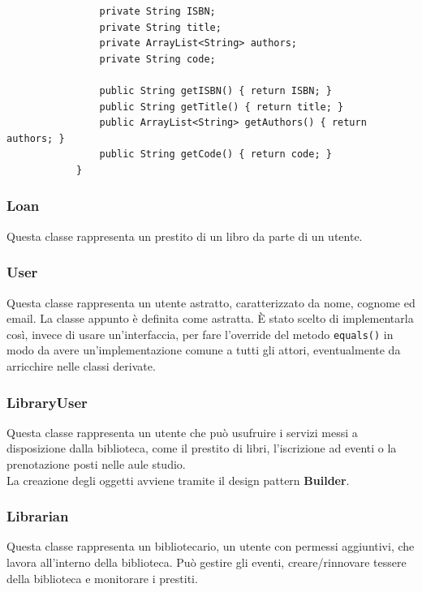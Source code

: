 \begin{listing}[H]
\begin{verbatim}
                private String ISBN;
                private String title;
                private ArrayList<String> authors;
                private String code;
            
                public String getISBN() { return ISBN; }
                public String getTitle() { return title; }
                public ArrayList<String> getAuthors() { return authors; }
                public String getCode() { return code; }
            }
        \end{verbatim}
        \caption{Implementazione del pattern Builder nella classe \texttt{Book}}
        \label{lst:bookBuilder}
    \end{listing}

    \subsubsection{Loan}
    Questa classe rappresenta un prestito di un libro da parte di un utente.\\

    \subsubsection{User}
    Questa classe rappresenta un utente astratto, caratterizzato da nome, cognome ed email. La classe appunto è definita come astratta. È stato scelto di implementarla così, invece di usare un'interfaccia, per fare l'override del metodo \texttt{equals()} in modo da avere un'implementazione comune a tutti gli attori, eventualmente da arricchire nelle classi derivate.\\

     \subsubsection{LibraryUser}
    Questa classe rappresenta un utente che può usufruire i servizi messi a disposizione dalla biblioteca, come il prestito di libri, l'iscrizione ad eventi o la prenotazione posti nelle aule studio.\\
    La creazione degli oggetti avviene tramite il design pattern \textbf{Builder}.
    
    \subsubsection{Librarian}
    Questa classe rappresenta un bibliotecario, un utente con permessi aggiuntivi, che lavora all'interno della biblioteca. Può gestire gli eventi, creare/rinnovare tessere della biblioteca e monitorare i prestiti.\\
    
